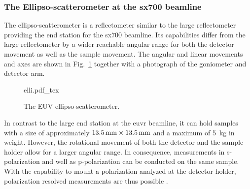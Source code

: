 \subsubsection{The Ellipso-scatterometer at the \gls{sx700} beamline}
The ellipso-scatterometer is a reflectometer similar to the large reflectometer providing the end station for the \gls{sx700} beamline. Its capabilities differ from the large reflectometer by a wider reachable angular range for both the detector movement as well as the sample movement. The angular and linear movements and axes are shown in Fig.~\ref{ch_exp:fig_elli} together with a photograph of the goniometer and detector arm.
\begin{figure}[htb]
    \def\svgwidth{\textwidth}
    {elli.pdf_tex}
    \caption[The EUV ellipso-scatterometer.]{The EUV ellipso-scatterometer.}
    \label{ch_exp:fig_elli}
\end{figure}
In contrast to the large end station at the \gls{euvr} beamline, it can hold samples with a size of approximately $\mm{13.5} \times \mm{13.5}$ and a maximum of \SI{5}{\kg} in weight. However, the rotational movement of both the detector and the sample holder allow for a larger angular range. In consequence, measurements in s-polarization and well as p-polarization can be conducted on the same sample. With the capability to mount a polarization analyzed at the detector holder, polarization resolved measurements are thus possible \cite{soltwisch_polarization_2015}.

